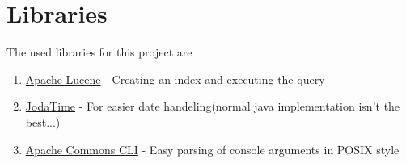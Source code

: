 \documentclass{scrartcl}
\begin{document}

\section{Libraries}
The used libraries for this project are

\begin{enumerate}
	\item \href{http://lucene.apache.org/}{Apache Lucene} - Creating an index and executing the query
	\item \href{http://www.joda.org/joda-time/}{JodaTime} - For easier date handeling(normal java implementation isn't the best...)
	\item \href{http://commons.apache.org/proper/commons-cli/}{Apache Commons CLI} - Easy parsing of console arguments in POSIX style
\end{enumerate}

\end{document}
